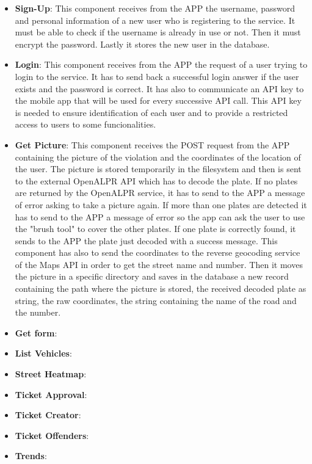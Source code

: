 \begin{itemize}
  \item \textbf{Sign-Up}: This component receives from the APP the username, password and personal information of a new user who is registering to the service. It must be able to check if the username is already in use or not. Then it must encrypt the password. Lastly it stores the new user in the database.
  \item \textbf{Login}: This component receives from the APP the request of a user trying to login to the service. It has to send back a successful login answer if the user exists and the password is correct. It has also to communicate an API key to the mobile app that will be used for every successive API call. This API key is needed to ensure identification of each user and to provide a restricted access to users to some funcionalities.
  \item \textbf{Get Picture}: This component receives the POST request from the APP containing the picture of the violation and the coordinates of the location of the user. The picture is stored temporarily in the filesystem and then is sent to the external OpenALPR API which has to decode the plate. If no plates are returned by the OpenALPR service, it has to send to the APP a message of error asking to take a picture again. If more than one plates are detected it has to send to the APP a message of error so the app can ask the user to use the "brush tool" to cover the other plates. If one plate is correctly found, it sends to the APP the plate just decoded with a success message. This component has also to send the coordinates to the reverse geocoding service of the Maps API in order to get the street name and number. Then it moves the picture in a specific directory and saves in the database a new record containing the path where the picture is stored, the received decoded plate as string, the raw coordinates, the string containing the name of the road and the number.

  \item \textbf{Get form}:
  \item \textbf{List Vehicles}:
  \item \textbf{Street Heatmap}:

  \item \textbf{Ticket Approval}:
  \item \textbf{Ticket Creator}:
  \item \textbf{Ticket Offenders}:
  \item \textbf{Trends}:

\end{itemize}


